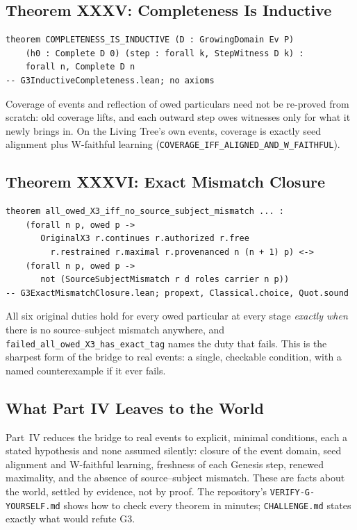 \documentclass[12pt,a4paper]{article}
\begin{document}
\subsection{Theorem XXXV: Completeness Is Inductive}

\begin{lstlisting}
theorem COMPLETENESS_IS_INDUCTIVE (D : GrowingDomain Ev P)
    (h0 : Complete D 0) (step : forall k, StepWitness D k) :
    forall n, Complete D n
-- G3InductiveCompleteness.lean; no axioms
\end{lstlisting}

Coverage of events and reflection of owed particulars need not be
re-proved from scratch: old coverage lifts, and each outward step owes
witnesses only for what it newly brings in. On the Living Tree's own
events, coverage is exactly seed alignment plus W-faithful learning
(\texttt{COVERAGE\_IFF\_ALIGNED\_AND\_W\_FAITHFUL}).

\subsection{Theorem XXXVI: Exact Mismatch Closure}

\begin{lstlisting}
theorem all_owed_X3_iff_no_source_subject_mismatch ... :
    (forall n p, owed p ->
       OriginalX3 r.continues r.authorized r.free
         r.restrained r.maximal r.provenanced n (n + 1) p) <->
    (forall n p, owed p ->
       not (SourceSubjectMismatch r d roles carrier n p))
-- G3ExactMismatchClosure.lean; propext, Classical.choice, Quot.sound
\end{lstlisting}

All six original duties hold for every owed particular at every stage
\emph{exactly when} there is no source--subject mismatch anywhere, and
\texttt{failed\_all\_owed\_X3\_has\_exact\_tag} names the duty that fails.
This is the sharpest form of the bridge to real events: a single,
checkable condition, with a named counterexample if it ever fails.

\subsection{What Part IV Leaves to the World}

Part~IV reduces the bridge to real events to explicit, minimal
conditions, each a stated hypothesis and none assumed silently: closure
of the event domain, seed alignment and W-faithful learning, freshness of
each Genesis step, renewed maximality, and the absence of source--subject
mismatch. These are facts about the world, settled by evidence, not by
proof. The repository's \texttt{VERIFY-G-YOURSELF.md} shows how to check
every theorem in minutes; \texttt{CHALLENGE.md} states exactly what would
refute G3.
\end{document}
